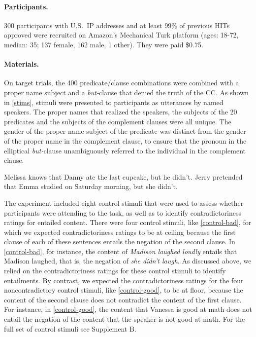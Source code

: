 \documentclass{language}
\newcommand{\6}{\mbox{$[\hspace*{-.6mm}[$}}
\newcommand{\9}{\mbox{$]\hspace*{-.6mm}]$}}
\begin{document}

\paragraph{Participants.} 300 participants with U.S.\ IP addresses and at least 99\% of previous HITs approved were recruited on Amazon's Mechanical Turk platform (ages: 18-72, median: 35; 137 female, 162 male, 1 other). They were paid \$0.75.

\paragraph{Materials.} On target trials, the 400 predicate/clause combinations were combined with a proper name subject and a {\em but-}clause that denied the truth of the CC. As shown in \ref{stims}, stimuli were presented to participants as utterances by named speakers. The proper names that realized the speakers, the subjects of the 20 predicates and the subjects of the complement clauses were all unique. The gender of the proper name subject of the predicate was distinct from the gender of the proper name in the complement clause, to ensure that the pronoun in the elliptical {\em but-}clause unambiguously referred to the individual in the complement clause.

\begin{exe}
\ex\label{stims}
\begin{xlist}
 Melissa knows that Danny ate the last cupcake, but he didn't.
  Jerry pretended that Emma studied on Saturday morning, but she didn't.
\end{xlist}
\end{exe}

The experiment  included eight control stimuli that were used to assess whether participants were attending to the task, as well as to identify contradictoriness ratings for entailed content. There were four control stimuli, like \ref{control-bad}, for which we expected contradictoriness ratings to be at ceiling because the first clause of each of these sentences entails the negation of the second clause. In \ref{control-bad}, for instance, the content of {\em Madison laughed loudly} entails that Madison laughed, that is, the negation of {\em she didn't laugh}. As discussed above, we relied on the contradictoriness ratings for these control stimuli to identify entailments. By contrast, we expected the contradictoriness ratings for the four noncontradictory control stimuli, like \ref{control-good}, to be at floor, because the content of the second clause does not contradict the content of the first clause. For instance, in \ref{control-good}, the content that Vanessa is good at math does not entail the negation of the content that the speaker is not good at math. For the full set of control stimuli see Supplement B.
\end{document}
